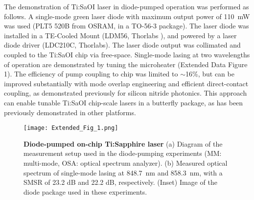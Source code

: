 \documentclass[amsmath, amsthm, amssymb, aps, prb, superscriptaddress, twocolumn, nofootinbib, 10pt]{revtex4-1}%
\begin{document}
The demonstration of Ti:SaOI laser in diode-pumped operation was performed as follows. A single-mode green laser diode with maximum output power of 110~mW was used (PLT5 520B from OSRAM, in a TO-56-3 package).
The laser diode was installed in a TE-Cooled Mount (LDM56, Thorlabs ), and powered by a laser diode driver (LDC210C, Thorlabs).
The laser diode output was collimated and coupled to the Ti:SaOI chip via free-space. Single-mode lasing at two wavelengths of operation are demonstrated by tuning the microheater (Extended Data Figure 1). The efficiency of pump coupling to chip was limited to $\sim$16\%, but can be improved substantially with mode overlap engineering and efficient direct-contact coupling, as demonstrated previously for silicon nitride photonics.\cite{corato2023widely} This approach can enable tunable Ti:SaOI chip-scale lasers in a butterfly package, as has been previously demonstrated in other platforms\cite{van2023long}.
%
\newline

\clearpage

\setcounter{figure}{0}
\renewcommand{\figurename}{Extended Data FIG.}
\renewcommand{\thefigure}{\arabic{figure}}

\begin{figure*}[t!]
\texttt{[image: Extended\_Fig\_1.png]}
\centering
\caption{\textbf{Diode-pumped on-chip Ti:Sapphire laser}
(a) Diagram of the measurement setup used in the diode-pumping experiments (MM: multi-mode, OSA: optical spectrum analyzer). 
(b) Measured optical spectrum of single-mode lasing at 848.7~nm and 858.3~nm, with a SMSR of 23.2 dB and 22.2 dB, respectively. (Inset) Image of the diode package used in these experiments.}
\label{fig_ext}
\end{figure*}

\pagebreak
%

%
\end{document}
